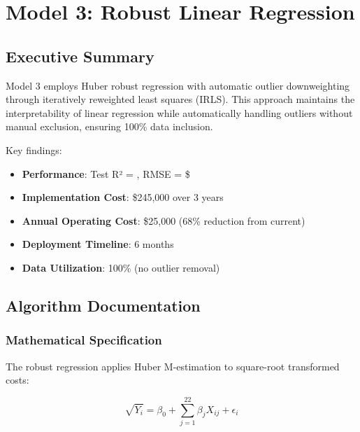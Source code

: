 
\chapter{Model 3: Robust Linear Regression}\label{ch:model3}



\section{Executive Summary}

Model 3 employs Huber robust regression with automatic outlier downweighting through iteratively reweighted least squares (IRLS). This approach maintains the interpretability of linear regression while automatically handling outliers without manual exclusion, ensuring 100\% data inclusion.

Key findings:
\begin{itemize}
    \item \textbf{Performance}: Test R² = \ModelThreeRSquaredTest{}, RMSE = \$\ModelThreeRMSETest{}
    \item \textbf{Implementation Cost}: \$245,000 over 3 years
    \item \textbf{Annual Operating Cost}: \$25,000 (68\% reduction from current)
    \item \textbf{Deployment Timeline}: 6 months
    \item \textbf{Data Utilization}: 100\% (no outlier removal)
\end{itemize}

\section{Algorithm Documentation}

\subsection{Mathematical Specification}

The robust regression applies Huber M-estimation to square-root transformed costs:

\begin{equation}
\sqrt{Y_i} = \beta_0 + \sum_{j=1}^{22} \beta_j X_{ij} + \epsilon_i
\end{equation}

